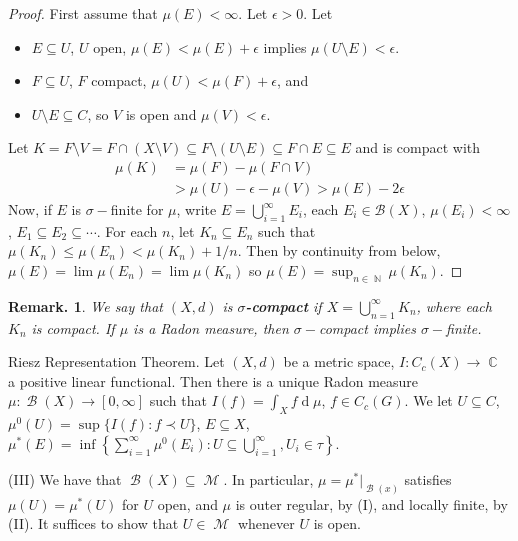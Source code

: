 \documentclass[11pt, a4paper]{memoir}
\DeclareMathOperator{\N}{{\mathbb{N}}}
\DeclareMathOperator{\C}{{\mathbb{C}}}
\newcommand{\mbf}[1]{{\boldmath\bfseries #1}}
\theoremstyle{change}
\theoremstyle{plain}
\theoremstyle{nonumberplain}
\newtheorem{remark}{Remark.}
\newtheorem{proof}{Proof}
\DeclareMathOperator{\M}{{\mathcal{M}}}
\DeclareMathOperator{\B}{{\mathcal{B}}}
\renewcommand{\d}[1]{\ensuremath{\operatorname{d}\!{#1}}}
\numberwithin{equation}{section}
\begin{document}
\begin{proof}
    First assume that $\mu(E)<\infty$.
    Let $\epsilon>0$.
    Let
    \begin{itemize}[nolistsep]
        \item $E\subseteq U$, $U$ open, $\mu(E)<\mu(E)+\epsilon$ implies $\mu(U\setminus E)<\epsilon$.
        \item $F\subseteq U$, $F$ compact, $\mu(U)<\mu(F)+\epsilon$, and
        \item $U\setminus E\subseteq C$, so $V$ is open and $\mu(V)<\epsilon$.
    \end{itemize}
    Let $K=F\setminus V=F\cap(X\setminus V)\subseteq F\setminus(U\setminus E)\subseteq F\cap E\subseteq E$ and is compact with
    \begin{align*}
        \mu(K) &= \mu(F)-\mu(F\cap V)\\
               &> \mu(U)-\epsilon-\mu(V)>\mu(E)-2\epsilon
    \end{align*}
    Now, if $E$ is $\sigma-$finite for $\mu$, write $E=\bigcup_{i=1}^\infty E_i$, each $E_i\in\mathcal{B}(X)$, $\mu(E_i)<\infty$, $E_1\subseteq E_2\subseteq\cdots$.
    For each $n$, let $K_n\subseteq E_n$ such that $\mu(K_n)\leq\mu(E_n)<\mu(K_n)+1/n$.
    Then by continuity from below, $\mu(E)=\lim\mu(E_n)=\lim\mu(K_n)$ so $\mu(E)=\sup_{n\in\N}\mu(K_n)$.
\end{proof}
\begin{remark}
    We say that $(X,d)$ is \mbf{$\sigma$-compact} if $X=\bigcup_{n=1}^\infty K_n$, where each $K_n$ is compact.
    If $\mu$ is a Radon measure, then $\sigma-$compact implies $\sigma-$finite.
\end{remark}

Riesz Representation Theorem.
Let $(X,d)$ be a metric space, $I:C_c(X)\to\C$ a positive linear functional.
Then there is a unique Radon measure $\mu:\B(X)\to[0,\infty]$ such that $I(f)=\int_X f\d{\mu}$, $f\in C_c(G)$.
We let $U\subseteq C$, $\mu^0(U)=\sup\{I(f):f\prec U\}$, $E\subseteq X$, $\mu^*(E)=\inf\left\{\sum_{i=1}^\infty\mu^0(E_i):U\subseteq\bigcup_{i=1}^\infty,U_i\in\tau\right\}$.

(III) We have that $\B(X)\subseteq\M$.
In particular, $\mu=\mu^*|_{\B(x)}$ satisfies $\mu(U)=\mu^*(U)$ for $U$ open, and $\mu$ is outer regular, by (I), and locally finite, by (II).
It suffices to show that $U\in\M$ whenever $U$ is open.
\end{document}
